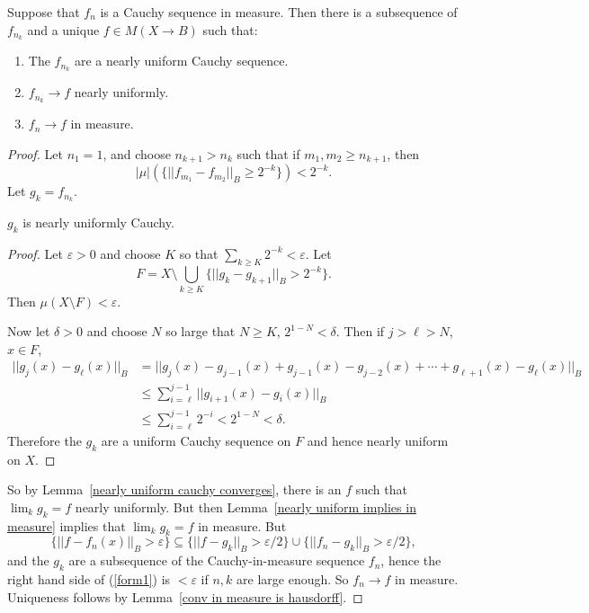 \begin{theorem}
Suppose that $f_{n}$ is a Cauchy sequence in measure. Then there is a subsequence of $f_{n_{k}}$ and a unique $f \in M(X \to B)$ such that:
\begin{enumerate}
\item The $f_{n_{k}}$ are a nearly uniform Cauchy sequence.
\item $f_{n_{k}} \to f$ nearly uniformly.
\item $f_{n} \to f$ in measure.
\end{enumerate}
\end{theorem}
\begin{proof}
Let $n_1 = 1$, and choose $n_{k+1} > n_{k}$ such that if $m_1, m_2 \geq n_{k+1}$, then
\[|\mu|(\{||f_{m_1} - f_{m_2}||_{B} \geq 2^{-k}\}) < 2^{-k}.\]
Let $g_{k} = f_{n_{k}}$.
\begin{sublemma}
$g_{k}$ is nearly uniformly Cauchy.
\end{sublemma}
\begin{proof}
Let $\varepsilon > 0$ and choose $K$ so that $\sum_{k\geq K} 2^{-k} < \varepsilon$. Let
\[F = X \setminus \bigcup_{k \geq K} \{||g_{k} - g_{k+1}||_{B} > 2^{-k}\}.\]
Then $\mu(X \setminus F) < \varepsilon$.

Now let $\delta > 0$ and choose $N$ so large that $N \geq K$, $2^{1-N} < \delta$. Then if $j > \ell > N$, $x \in F$,
\begin{align*}
||g_{j}(x) - g_\ell(x)||_{B} &= ||g_{j}(x) - g_{j-1}(x) + g_{j-1}(x) - g_{j-2}(x) + \cdots + g_{\ell+1}(x) - g_\ell(x)||_B\\
&\leq \sum_{i=\ell}^{j-1} ||g_{i+1}(x) - g_i(x)||_B\\
&\leq \sum_{i=\ell}^{j-1} 2^{-i} < 2^{1-N} < \delta.
\end{align*}
Therefore the $g_{k}$ are a uniform Cauchy sequence on $F$ and hence nearly uniform on $X$.
\end{proof}
So by Lemma~\ref{nearly uniform cauchy converges}, there is an $f$ such that $\lim_{k} g_{k} = f$ nearly uniformly.
But then Lemma~\ref{nearly uniform implies in measure} implies that $\lim_{k} g_{k} = f$ in measure.
But
\begin{equation}
\label{form1}\{||f - f_{n}(x)||_{B} > \varepsilon\} \subseteq \{||f - g_{k}||_{B} > \varepsilon/2\} \cup \{||f_{n} - g_{k}||_{B} > \varepsilon/2\},
\end{equation}
and the $g_{k}$ are a subsequence of the Cauchy-in-measure sequence $f_{n}$, hence the right hand side of (\ref{form1}) is $<\varepsilon$ if $n,k$ are large enough. So $f_{n} \to f$ in measure.
Uniqueness follows by Lemma~\ref{conv in measure is hausdorff}.
\end{proof}


